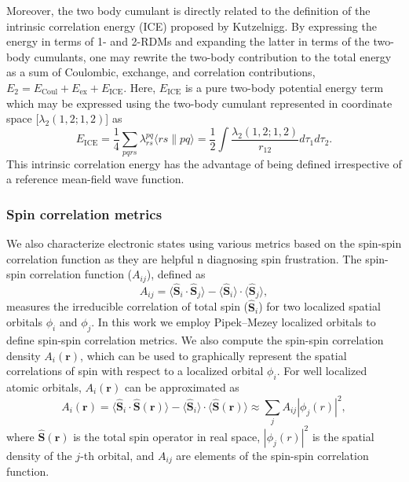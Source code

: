 \documentclass[aip,jcp,amsmath,amssymb, reprint]{revtex4-1}
\begin{document}
Moreover, the two body cumulant is directly related to the definition of the intrinsic correlation energy (ICE) proposed by Kutzelnigg.\cite{kutzelnigg2003theory}
By expressing the energy in terms of 1- and 2-RDMs and expanding the latter in terms of the two-body cumulants, one may rewrite the two-body contribution to the total energy as a sum of Coulombic, exchange, and correlation contributions, $E_{2} = E_{\text{Coul}} + E_{\text{ex}} + E_{\text{ICE}}$.
Here, $E_{\text{ICE}}$ is a pure two-body potential energy term which may be expressed using the two-body cumulant represented in coordinate space [$\lambda_{2}(1,2;1,2)$] as
\begin{equation}
E_{\text{ICE}} =\frac{1}{4} \sum_{pqrs} \lambda^{pq}_{rs} \langle{rs \| pq} \rangle = \frac{1}{2}\int \frac{\lambda_{2}(1,2;1,2)}{r_{12}} d\tau_{1}d\tau_{2} 
.
\end{equation}
This intrinsic correlation energy has the advantage of being defined irrespective of a reference mean-field wave function.

\subsubsection{Spin correlation metrics}

We also characterize electronic states using various metrics based on the spin-spin correlation function as they are helpful n diagnosing spin frustration.
The spin-spin correlation function ($A_{ij}$), defined as 
\begin{equation}
A_{ij} = \langle \mathbf{\hat{S}}_{i} \cdot \mathbf{\hat{S}}_{j} \rangle - \langle \mathbf{\hat{S}}_{i} \rangle \cdot \langle \mathbf{\hat{S}}_{j} \rangle,
\end{equation}
measures the irreducible correlation of total spin ($ \mathbf{\hat{S}}_{i}$) for two localized spatial orbitals $\phi_i$ and $\phi_j$.
In this work we employ Pipek--Mezey localized orbitals\cite{Pipek1989FastIntrinsic} to define spin-spin correlation metrics.
We also compute the spin-spin correlation density $A_{i}(\mathbf{r})$, which can be used to graphically represent the spatial correlations of spin with respect to a localized orbital $\phi_i$.
For well localized atomic orbitals, $A_{i}(\mathbf{r})$ can be approximated as
\begin{equation}
A_{i}(\mathbf{r}) = \langle \mathbf{\hat{S}}_{i} \cdot \mathbf{\hat{S}}(\mathbf{r})\rangle -   \langle \mathbf{\hat{S}}_{i} \rangle \cdot \langle \mathbf{\hat{S}}(\mathbf{r}) \rangle\approx \sum_{j} A_{ij} |\phi_{j}(r)|^{2},
\end{equation}
where $\mathbf{\hat{S}}(\mathbf{r})$ is the total spin operator in real space, $|\phi_{j}(r)|^{2}$ is the spatial density of the $j$-th orbital, and $A_{ij}$ are elements of the spin-spin correlation function.
\end{document}
